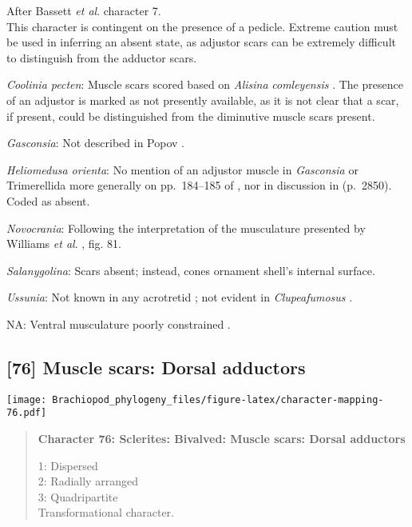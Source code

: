 \documentclass[openany]{book}
\theoremstyle{definition}
\theoremstyle{definition}
\theoremstyle{definition}
\theoremstyle{remark}
\begin{document}
After Bassett \emph{et al}.
\citeyearpar{Bassett2001Functionalmorphology} character 7.\\
This character is contingent on the presence of a pedicle. Extreme
caution must be used in inferring an absent state, as adjustor scars can
be extremely difficult to distinguish from the adductor scars.

\hypertarget{Coolinia_pecten-coding-75}{}
\emph{Coolinia pecten}: Muscle scars scored based on \emph{Alisina}
\emph{comleyensis} \citep{Bassett2001Functionalmorphology}. The presence
of an adjustor is marked as not presently available, as it is not clear
that a scar, if present, could be distinguished from the diminutive
muscle scars present.

\hypertarget{Gasconsia-coding-75}{}
\emph{Gasconsia}: Not described in Popov
\citeyearpar{Popov1992TheCambrian}.

\hypertarget{Heliomedusa_orienta-coding-75}{}
\emph{Heliomedusa orienta}: No mention of an adjustor muscle in
\emph{Gasconsia} or Trimerellida more generally on pp.~184--185 of
\citet{Williams2000LinguliformeaCraniiformea}, nor in discussion in
\citet{Williams2007Supplement} (p.~2850). Coded as absent.

\hypertarget{Novocrania-coding-75}{}
\emph{Novocrania}: Following the interpretation of the musculature
presented by Williams \emph{et al}.
\citeyearpar{Williams2000LinguliformeaCraniiformea}, fig. 81.

\hypertarget{Salanygolina-coding-75}{}
\emph{Salanygolina}: Scars absent; instead, cones ornament shell's
internal surface.

\hypertarget{Ussunia-coding-75}{}
\emph{Ussunia}: Not known in any acrotretid
\citep{Williams2000LinguliformeaCraniiformea}; not evident in
\emph{Clupeafumosus} \citep{Topper2013Reappraisalof}.

\hypertarget{NA-coding-75}{}
NA: Ventral musculature poorly constrained
\citep{Williams2000LinguliformeaCraniiformea, Popov2009Earlyontogeny}.

\subsection*{{[}76{]} Muscle scars: Dorsal
adductors}\label{muscle-scars-dorsal-adductors}

\texttt{[image: Brachiopod\_phylogeny\_files/figure-latex/character-mapping-76.pdf]}

\begin{quote}
\textbf{Character 76: Sclerites: Bivalved: Muscle scars: Dorsal
adductors}

1: Dispersed\\
2: Radially arranged\\
3: Quadripartite\\
Transformational character.
\end{quote}
\end{document}
